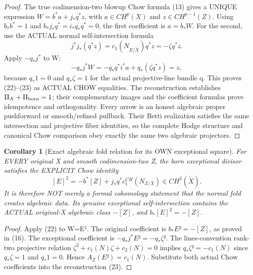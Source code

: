 \documentclass[11pt]{article}
\newtheorem{corollary}[theorem]{Corollary}
\begin{document}
\begin{proof}
The true codimension-two blowup Chow formula
(13) gives a UNIQUE expression
$W=b^*a+j_*q^*z$, with
$a\in CH^p(X)$ and $z\in CH^{p-1}(Z)$.
Using $b_*b^*=1$ and
$b_*j_*q^*=i_*q_*q^*=0$,
the first coefficient is $a=b_*W$.
For the second, use the
ACTUAL normal self-intersection formula
\[
 j^*j_*(q^*z)=
 c_1(N_{E/\widetilde X})q^*z
 =-\zeta q^*z.
\]
Apply $-q_*j^*$ to W:
\[
 -q_*j^*W
 =-q_*q^*i^*a+q_*(\zeta q^*z)
 =z,
\]
because $q_*1=0$ and $q_*\zeta=1$
for the actual projective-line bundle q.
This proves (22)--(23) as ACTUAL CHOW equalities.
The reconstruction establishes $\Pi_X+\Pi_{\rm born}=1$;
their complementary images and the coefficient
formulas prove idempotence and orthogonality.
Every arrow is an honest algebraic proper
pushforward or smooth/refined pullback.
Their Betti realization satisfies the same
intersection and projective fiber identities,
so the complete Hodge structure and
canonical Chow comparison obey exactly
the same two algebraic projectors.
\end{proof}

\begin{corollary}[Exact algebraic fold relation for its OWN exceptional square]
For EVERY original X and smooth codimension-two Z,
the born exceptional divisor satisfies the
EXPLICIT Chow identity
\[
 \boxed{
 [E]^2=-b^*[Z]+
 j_*q^*c_1^{CH}(N_{Z/X})
     \in CH^2(\widetilde X).
 }                                                     \tag{25}
\]
It is therefore NOT merely a formal cohomology
statement that the normal fold creates algebraic
data. Its genuine exceptional self-intersection
contains the ACTUAL original-X algebraic class
$-[Z]$, and $b_*[E]^2=-[Z]$.
\end{corollary}
\begin{proof}
Apply (22) to W=E². The
original coefficient is $b_*E²=-[Z]$,
as proved in (16).
The exceptional coefficient is
$-q_*j^*E²=-q_*\zeta²$.
The lines-convention rank-two projective
relation $\zeta^2+c_1(N)\zeta+c_2(N)=0$
implies $q_*\zeta²=-c_1(N)$ since
$q_*\zeta=1$ and $q_*1=0$.
Hence $A_Z(E²)=c_1(N)$.
Substitute both actual Chow coefficients
into the reconstruction (23).
\end{proof}
\end{document}

